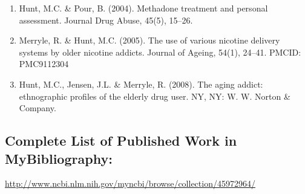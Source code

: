 \documentclass{nihbiosketch}
\begin{document}
\begin{enumerate}
\begin{enumerate}
\item Hunt, M.C. \& Pour, B. (2004). Methadone treatment and personal
        assessment. Journal Drug Abuse, 45(5), 15--26. 

\item  Merryle, R. \& Hunt, M.C. (2005). The use of various nicotine delivery
        systems by older nicotine addicts. Journal of Ageing, 54(1), 24--41.
        PMCID: PMC9112304

\item Hunt, M.C., Jensen, J.L. \& Merryle, R. (2008). The aging addict:
        ethnographic profiles of the elderly drug user.  NY, NY: W. W. Norton
        \& Company.

\end{enumerate}

\end{enumerate}

\subsection*{Complete List of Published Work in MyBibliography:} 
\url{http://www.ncbi.nlm.nih.gov/myncbi/browse/collection/45972964/}
\end{document}

